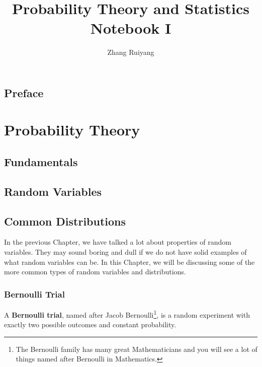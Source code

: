 \documentclass[11pt, a4paper, oneside]{book}
\theoremstyle{definition}
\begin{document}
\frontmatter 

\title{\huge Probability Theory and Statistics Notebook I}
\author{\Large{Zhang Ruiyang}}
\date{}
\maketitle

\tableofcontents

\newpage

\chapter*{Preface}

\mainmatter

\part{Probability Theory} 

\chapter{Fundamentals}
\chapter{Random Variables}

\newpage


\chapter{Common Distributions}

\noindent In the previous Chapter, we have talked a lot about properties of random variables. They may sound boring and dull if we do not have solid examples of what random variables can be. In this Chapter, we will be discussing some of the more common types of random variables and distributions.

\section{Bernoulli Trial}

\noindent A \textbf{Bernoulli trial}, named after Jacob Bernoulli\footnote{The Bernoulli family has many great Mathematicians and you will see a lot of things named after Bernoulli in Mathematics.}, is a random experiment with exactly two possible outcomes and constant probability. 
\end{document}
